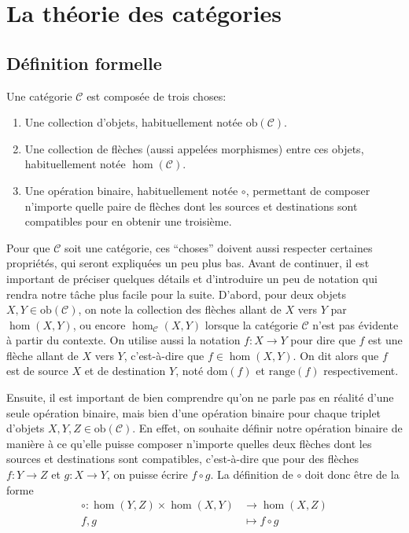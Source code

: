 \section{La théorie des catégories}

\subsection{Définition formelle}
    \newcommand{\C}{\mathcal{C}}
    \newcommand{\dom}{\mathrm{dom}}
    \newcommand{\range}{\mathrm{range}}
    \newcommand{\ob}[1]{\mathrm{ob}(#1)}

Une catégorie $\C$ est composée de trois choses:
\begin{enumerate}
    \item Une collection d'objets, habituellement notée $\ob{\C}$.
    \item Une collection de flèches (aussi appelées morphismes) entre ces
          objets, habituellement notée $\hom(\C)$.
    \item Une opération binaire, habituellement notée $\circ$, permettant de
          composer n'importe quelle paire de flèches dont les sources et
          destinations sont compatibles pour en obtenir une troisième.
\end{enumerate}

Pour que $\C$ soit une catégorie, ces ``choses'' doivent aussi respecter
certaines propriétés, qui seront expliquées un peu plus bas. Avant de
continuer, il est important de préciser quelques détails et d'introduire
un peu de notation qui rendra notre tâche plus facile pour la suite. D'abord,
pour deux objets $X, Y \in \ob{\C}$, on note la collection des flèches allant
de $X$ vers $Y$ par $\hom(X, Y)$, ou encore $\hom_\C(X, Y)$ lorsque la catégorie
$\C$ n'est pas évidente à partir du contexte. On utilise aussi la notation
$f : X \to Y$ pour dire que $f$ est une flèche allant de $X$ vers $Y$,
c'est-à-dire que $f \in \hom(X, Y)$. On dit alors que $f$ est de source
$X$ et de destination $Y$, noté $\dom(f)$ et $\range(f)$ respectivement.

Ensuite, il est important de bien comprendre qu'on ne parle pas en réalité
d'une seule opération binaire, mais bien d'une opération binaire pour chaque
triplet d'objets $X, Y, Z \in \ob{\C}$. En effet, on souhaite définir notre
opération binaire de manière à ce qu'elle puisse composer n'importe quelles
deux flèches dont les sources et destinations sont compatibles, c'est-à-dire
que pour des flèches $f : Y \to Z$ et $g : X \to Y$, on puisse écrire
$f \circ g$. La définition de $\circ$ doit donc être de la forme
\begin{align*}
    \circ : \hom(Y, Z) \times \hom(X, Y) &\to \hom(X, Z) \\
             f, g &\mapsto f \circ g
\end{align*}

